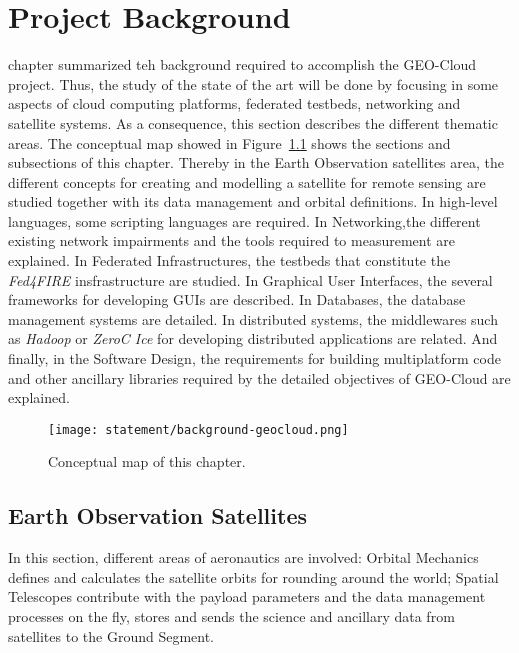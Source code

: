 \chapter{Project Background}
\label{chap:antecedentes}


 chapter summarized teh background required to accomplish the
GEO-Cloud project. Thus, the study of the state of the art will be done by
focusing in some aspects of cloud computing platforms, federated testbeds,
networking and satellite systems. As a consequence, this section describes the different thematic areas.
The conceptual map showed in Figure~\ref{fig:intr-conceptual-map} shows the
sections and subsections of this chapter. Thereby in the Earth Observation
satellites area, the different concepts for creating and modelling a satellite
for remote sensing are studied together with its data management and orbital
definitions. In high-level languages, some scripting languages are required. In
Networking,the different existing network impairments and the tools required to
measurement are explained. In Federated Infrastructures, the testbeds that
constitute the \emph{Fed4FIRE} insfrastructure are studied. In Graphical User Interfaces, the several
frameworks for developing \acp{GUI} are described. In Databases, the database
management systems are detailed. In distributed systems, the middlewares such as \emph{Hadoop} or
\emph{ZeroC Ice} for developing distributed applications are related. And finally, in
the Software Design, the requirements for building multiplatform code and other
ancillary libraries required by the detailed objectives of GEO-Cloud are explained.

\begin{figure}[!h]
\begin{center}
\texttt{[image: statement/background-geocloud.png]}
\caption{Conceptual map of this chapter.}
\label{fig:intr-conceptual-map}
\end{center}
\end{figure}


\section{Earth Observation Satellites}

In this section, different areas of aeronautics are involved: Orbital
Mechanics defines and calculates the satellite orbits for rounding around
the world;  Spatial Telescopes  contribute with the payload parameters and the
data management processes on the fly, stores and sends the science and ancillary
data from satellites to the Ground Segment.

